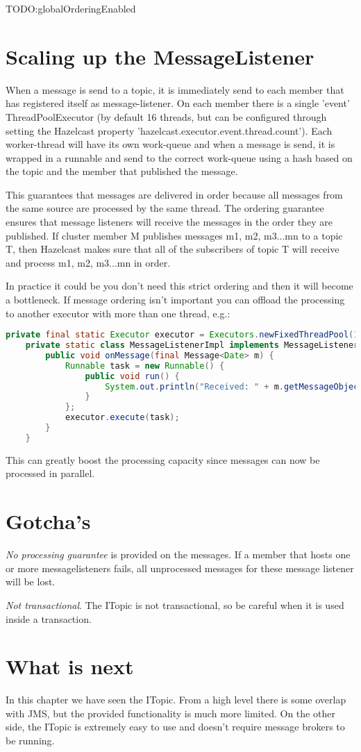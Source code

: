 TODO:globalOrderingEnabled

\section{Scaling up the MessageListener}
When a message is send to a topic, it is immediately send to each member that has registered itself as message-listener. On each member there is a single 'event' ThreadPoolExecutor (by default 16 threads, but can be configured through setting the Hazelcast property 'hazelcast.executor.event.thread.count'). Each worker-thread will have its own work-queue and when a message is send, it is wrapped in a runnable and send to the correct work-queue using a hash based on the topic and the member that published the message.

This guarantees that messages are delivered in order because all messages from the same source are processed by the same thread. The ordering guarantee ensures that message listeners will receive the messages in the order they are published. If cluster member M publishes messages m1, m2, m3...mn to a topic T, then Hazelcast makes sure that all of the subscribers of topic T will receive and process m1, m2, m3...mn in order. 

In practice it could be you don't need this strict ordering and then it will become a bottleneck. If message ordering isn't important you can offload the processing to another executor with more than one thread, e.g.:
\begin{lstlisting}[language=java]
    private final static Executor executor = Executors.newFixedThreadPool(10);       
    private static class MessageListenerImpl implements MessageListener<Date> {
        public void onMessage(final Message<Date> m) {
            Runnable task = new Runnable() {
                public void run() {
                    System.out.println("Received: " + m.getMessageObject());
                }
            };
            executor.execute(task);
        }
    } 
\end{lstlisting}
This can greatly boost the processing capacity since messages can now be processed in parallel.

\section{Gotcha's}

\emph{No processing guarantee} is provided on the messages. If a member that hosts one or more messagelisteners fails, all unprocessed messages for these message listener will be lost.

\emph{Not transactional}. The ITopic is not transactional, so be careful when it is used inside a transaction.

\section{What is next}
In this chapter we have seen the ITopic. From a high level there is some overlap with JMS, but the provided functionality is much more limited. On the other side, the ITopic is extremely easy to use and doesn't require message brokers to be running.
